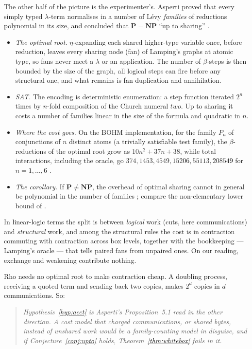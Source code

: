 \documentclass[11pt]{article}
\theoremstyle{definition}
\theoremstyle{plain}
\theoremstyle{remark}
\newcommand{\Pclass}{\mathbf{P}}
\newcommand{\NPclass}{\mathbf{NP}}
\begin{document}
The other half of the picture is the experimenter's. Asperti proved that
every simply typed $\lambda$-term normalises in a number of Lévy
\emph{families} of reductions polynomial in its size, and concluded that
$\Pclass = \NPclass$ ``up to sharing'' \cite{AspertiSharing}.
\begin{itemize}
\item \emph{The optimal root.} $\eta$-expanding each shared higher-type
variable once, before reduction, leaves every sharing node (fan) of
Lamping's graphs \cite{Lamping90} at atomic type, so fans never meet a
$\lambda$ or an application. The number of $\beta$-steps is then bounded
by the size of the graph, all logical steps can fire before any
structural one, and what remains is fan duplication and annihilation.
\item \emph{SAT.} The encoding is deterministic enumeration: a step
function iterated $2^n$ times by $n$-fold composition of the Church
numeral $\mathit{two}$. Up to sharing it costs a number of families
linear in the size of the formula and quadratic in $n$.
\item \emph{Where the cost goes.} On the BOHM implementation, for the
family $P_n$ of conjunctions of $n$ distinct atoms (a trivially
satisfiable test family), the $\beta$-reductions of the optimal root grow
as $10n^2 + 37n + 38$, while total interactions, including the oracle, go
$374, 1453, 4549, 15206, 55113, 208549$ for $n = 1, \dots, 6$
\cite{AspertiSharing}.
\item \emph{The corollary.} If $\Pclass \neq \NPclass$, the overhead of
optimal sharing cannot in general be polynomial in the number of families
\cite[Prop.~5.1]{AspertiSharing}; compare the non-elementary lower bound
of \cite{AspertiMairson98}.
\end{itemize}

In linear-logic terms the split is between \emph{logical} work (cuts,
here communications) and \emph{structural} work, and among the structural
rules the cost is in contraction commuting with contraction across box
levels, together with the bookkeeping --- Lamping's oracle --- that tells
paired fans from unpaired ones. On our reading, exchange and weakening
contribute nothing.

Rho needs no optimal root to make contraction cheap. A doubling process,
receiving a quoted term and sending back two copies, makes $2^d$ copies in
$d$ communications. So:

\begin{quote}
\itshape Hypothesis~\ref{hyp:acct} is Asperti's Proposition~5.1 read in
the other direction. A cost model that charged communications, or shared
bytes, instead of unshared work would be a family-counting model in
disguise, and if Conjecture~\ref{conj:upto} holds, Theorem~\ref{thm:whitebox}
fails in it.
\end{quote}
\end{document}
